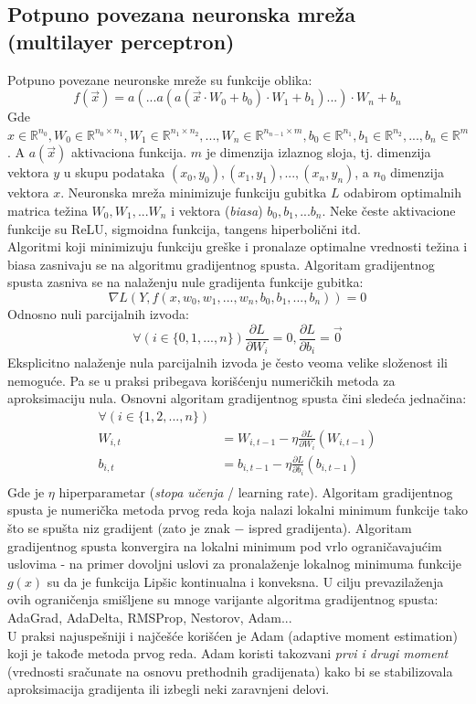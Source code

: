 \documentclass[a4paper,fleqn,12pt]{JMThesis}
\theoremstyle{plain}
\theoremstyle{definition}
\theoremstyle{definition}
\begin{document}
\subsection{Potpuno povezana neuronska mreža (multilayer perceptron)}
Potpuno povezane neuronske mreže su funkcije oblika:
\[
	f(\vec{x}) = a(...a(a(\vec{x} \cdot W_0 + b_0) \cdot W_1 + b_1)...)\cdot W_n + b_n
\]
Gde $x \in \mathbb{R}^{n_0}, W_0 \in \mathbb{R}^{n_0 \times n_1}, W_1 \in \mathbb{R}^{n_1 \times n_2},...,W_n \in \mathbb{R}^{n_{n-1} \times m},
b_0 \in \mathbb{R}^{n_1}, b_1 \in \mathbb{R}^{n_2}, ... , b_n \in \mathbb{R}^{m}$. A $a(\vec{x})$ aktivaciona funkcija.
$m$ je dimenzija izlaznog sloja, tj. dimenzija vektora $y$ u skupu podataka $(x_0,y_0), (x_1,y_1), ... , (x_n, y_n)$, a $n_0$ dimenzija vektora $x$.
Neuronska mreža minimizuje funkciju gubitka $L$ odabirom optimalnih matrica težina $W_0, W_1, ... W_n$ i vektora (\textit{biasa}) $b_0, b_1, ... b_n$.
Neke česte aktivacione funkcije su ReLU, sigmoidna funkcija, tangens hiperbolični itd.\\
Algoritmi koji minimizuju funkciju greške i pronalaze optimalne vrednosti težina i biasa zasnivaju se na algoritmu gradijentnog spusta.
Algoritam gradijentnog spusta zasniva se na nalaženju nule gradijenta funkcije gubitka:
\[ \nabla L(Y,f(x,w_0,w_1,...,w_n,b_0,b_1,...,b_n)) = 0 \]
Odnosno nuli parcijalnih izvoda:
\[ \forall(i \in \{0,1,...,n\}) \frac{\partial L}{\partial W_i} = 0, \frac{\partial L}{\partial b_i} = \vec{0} \]
Eksplicitno nalaženje nula parcijalnih izvoda je često veoma velike složenost ili nemoguće. Pa se u praksi pribegava korišćenju
numeričkih metoda za aproksimaciju nula. Osnovni algoritam gradijentnog spusta čini sledeća jednačina:
\[
	\begin{split}
		\forall (i \in \{1,2,...,n\})\\
		W_{i,t} &= W_{i,t-1} - \eta \frac{\partial L}{\partial W_i}(W_{i,t-1})\\
		b_{i,t} &= b_{i,t-1} - \eta \frac{\partial L}{\partial b_i}(b_{i,t-1})\\
	\end{split}
\]
Gde je $\eta$ hiperparametar (\textit{stopa učenja} / learning rate). Algoritam gradijentnog spusta je numerička metoda prvog reda
koja nalazi lokalni minimum funkcije tako što se spušta niz gradijent (zato je znak $-$ ispred gradijenta). Algoritam gradijentnog spusta
konvergira na lokalni minimum pod vrlo ograničavajućim uslovima - na primer dovoljni uslovi za pronalaženje lokalnog minimuma
funkcije $g(x)$ su da je funkcija Lipšic kontinualna i konveksna. U cilju prevazilaženja ovih ograničenja smišljene su mnoge varijante
algoritma gradijentnog spusta: AdaGrad, AdaDelta, RMSProp, Nestorov, Adam...\\
U praksi najuspešniji i najčešće korišćen je Adam (adaptive moment estimation) koji je takođe metoda prvog reda. Adam koristi
takozvani \textit{prvi i drugi moment} (vrednosti sračunate na osnovu prethodnih gradijenata) kako bi se stabilizovala aproksimacija
gradijenta ili izbegli neki zaravnjeni delovi.
\end{document}
